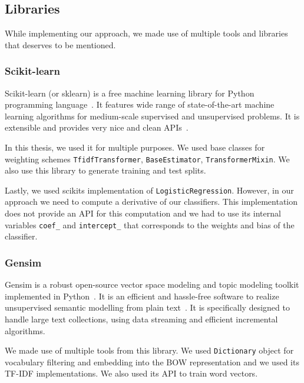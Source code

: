     \subsection{Libraries} 

    While implementing our approach, we made use of multiple tools and libraries that deserves to be mentioned.

    \subsubsection{Scikit-learn}
    
    Scikit-learn (or sklearn) is a free machine learning library for Python programming language~\cite{scikit-learn}.
    It features wide range of state-of-the-art machine learning algorithms for medium-scale supervised and unsupervised problems.
    It is extensible and provides very nice and clean APIs~\cite{sklearn_api}.
    
    In this thesis, we used it for multiple purposes.
    We used base classes for weighting schemes \texttt{TfidfTransformer}, \texttt{BaseEstimator}, \texttt{TransformerMixin}.
    We also use this library to generate training and test splits. 
    
    Lastly, we used scikits implementation of \texttt{LogisticRegression}.
    However, in our approach we need to compute a derivative of our classifiers. 
    This implementation does not provide an API for this computation and we had to use
    its internal variables \texttt{coef\_} and \texttt{intercept\_} that corresponds to the weights and bias of the classifier.
    
    \subsubsection{Gensim}
    
    Gensim is a robust open-source vector space modeling and topic modeling toolkit implemented in Python~\cite{rehurek_lrec}. 
    It is an efficient and hassle-free software to realize unsupervised semantic modelling from plain text~\cite{bird2009natural}. %
    It is specifically designed to handle large text collections, using data streaming and efficient incremental algorithms. 
    
    We made use of multiple tools from this library. 
    We used \texttt{Dictionary} object for vocabulary filtering and embedding into the BOW representation and we used its TF-IDF implementations.
    We also used its API to train word vectors. 
    
